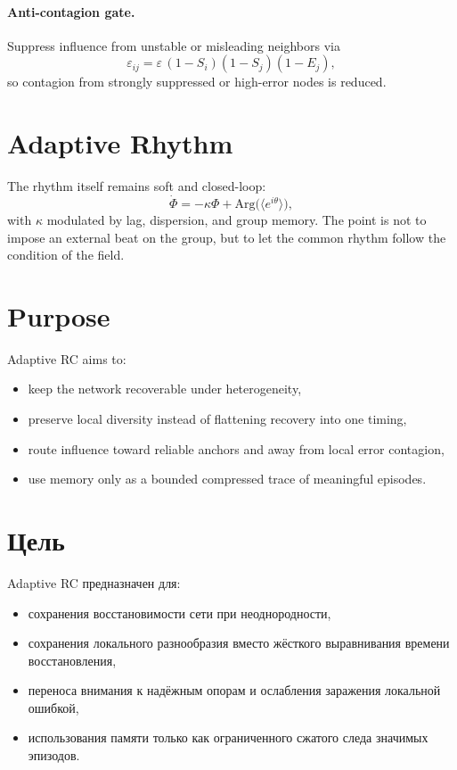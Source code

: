 ﻿\documentclass[12pt,a4paper]{article}
\begin{document}
\paragraph{Anti-contagion gate.}
Suppress influence from unstable or misleading neighbors via
\begin{equation}
\varepsilon_{ij}=\varepsilon\,(1-S_i)(1-S_j)(1-E_j),
\end{equation}
so contagion from strongly suppressed or high-error nodes is reduced.

\section{Adaptive Rhythm}
The rhythm itself remains soft and closed-loop:
\begin{equation}
\dot{\Phi}=-\kappa\Phi + \mathrm{Arg}\big(\langle e^{i\theta}\rangle\big),
\end{equation}
with $\kappa$ modulated by lag, dispersion, and group memory. The point is not to impose an external beat on the group, but to let the common rhythm follow the condition of the field.

\section{Purpose}
Adaptive RC aims to:
\begin{itemize}
    \item keep the network recoverable under heterogeneity,
    \item preserve local diversity instead of flattening recovery into one timing,
    \item route influence toward reliable anchors and away from local error contagion,
    \item use memory only as a bounded compressed trace of meaningful episodes.
\end{itemize}

\section{Цель}
Adaptive RC предназначен для:
\begin{itemize}
    \item сохранения восстановимости сети при неоднородности,
    \item сохранения локального разнообразия вместо жёсткого выравнивания времени восстановления,
    \item переноса внимания к надёжным опорам и ослабления заражения локальной ошибкой,
    \item использования памяти только как ограниченного сжатого следа значимых эпизодов.
\end{itemize}
\end{document}
